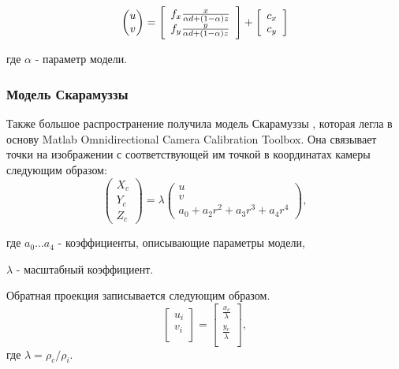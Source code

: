 \begin{equation}
    \vspace{12pt}
    \begin{pmatrix}u\\v\end{pmatrix}=\left[\begin{array}{l}
	f_{x} \frac{x}{\alpha d+(1-\alpha) z} \\
	f_{y} \frac{y}{\alpha d+(1-\alpha) z}
	\end{array}\right]+\left[\begin{array}{l}
	c_{x} \\
	c_{y}
	\end{array}\right]
    \vspace{12pt}
\end{equation}

где $\alpha$ - параметр модели. 

\vspace{\baselineskip}

\subsubsection{Модель Скарамуззы}

Также большое распространение получила модель Скарамуззы \cite{scaramuzza}, которая легла в основу Matlab Omnidirectional 
Camera Calibration Toolbox. Она связывает точки на изображении с соответствующей им точкой в координатах камеры
следующим образом:
\vskip 12pt
\begin{equation}	
    \begin{pmatrix}X_c\\Y_c\\Z_c\end{pmatrix} = \lambda \begin{pmatrix}u\\v\\a_0 + a_2 r^2 + a_3 r^3 + a_4 r^4\end{pmatrix},
    \label{eqn:scaramuzza} 
\end{equation}
\vskip 24pt

где $a_0 ... a_4$ - коэффициенты, описывающие параметры модели,

\qquad $\lambda$ - масштабный коэффициент.

Обратная проекция записывается следующим образом.
\vskip 12pt
\begin{equation}
    \label{eq:back_scara}
    \left[\begin{matrix}u_i\\v_i\\\end{matrix}\right] = \left[\begin{matrix} \frac{x_c}{\lambda}  \\  \frac{y_c}{\lambda} \\\end{matrix}\right],
\end{equation} 
\vskip 24pt
где $\lambda = \rho_c / \rho_i$. 

